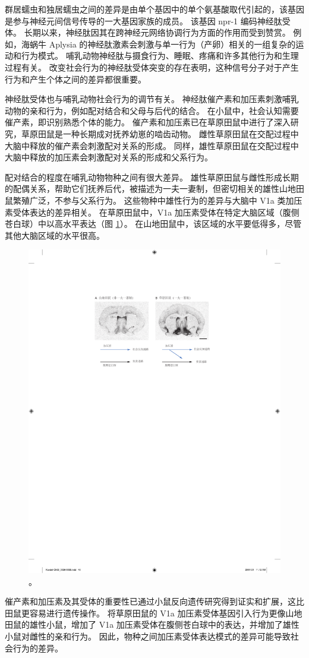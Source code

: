 群居蠕虫和独居蠕虫之间的差异是由单个基因中的单个氨基酸取代引起的，该基因是参与神经元间信号传导的一大基因家族的成员。 
该基因 npr-1 编码神经肽受体。 
长期以来，神经肽因其在跨神经元网络协调行为方面的作用而受到赞赏。 
例如，海蜗牛 Aplysia 的神经肽激素会刺激与单一行为（产卵）相关的一组复杂的运动和行为模式。 
哺乳动物神经肽与摄食行为、睡眠、疼痛和许多其他行为和生理过程有关。 
改变社会行为的神经肽受体突变的存在表明，这种信号分子对于产生行为和产生个体之间的差异都很重要。


神经肽受体也与哺乳动物社会行为的调节有关。 
神经肽催产素和加压素刺激哺乳动物的亲和行为，例如配对结合和父母与后代的结合。 
在小鼠中，社会认知需要催产素，即识别熟悉个体的能力。 
催产素和加压素已在草原田鼠中进行了深入研究，草原田鼠是一种长期成对抚养幼崽的啮齿动物。 
雌性草原田鼠在交配过程中大脑中释放的催产素会刺激配对关系的形成。 
同样，雄性草原田鼠在交配过程中大脑中释放的加压素会刺激配对关系的形成和父系行为。


配对结合的程度在哺乳动物物种之间有很大差异。 
雄性草原田鼠与雌性形成长期的配偶关系，帮助它们抚养后代，被描述为一夫一妻制，但密切相关的雄性山地田鼠繁殖广泛，不参与父系行为。 
这些物种中雄性行为的差异与大脑中 V1a 类加压素受体表达的差异相关。 
在草原田鼠中，V1a 加压素受体在特定大脑区域（腹侧苍白球）中以高水平表达（图 \ref{fig:2_16}）。 
在山地田鼠中，该区域的水平要低得多，尽管其他大脑区域的水平很高。

\begin{figure}[htbp]
	\centering
	\includegraphics[width=0.5\linewidth]{chap02/fig_2_16}
	\caption{。}
	\label{fig:2_16}
\end{figure}


催产素和加压素及其受体的重要性已通过小鼠反向遗传研究得到证实和扩展，这比田鼠更容易进行遗传操作。 
将草原田鼠的 V1a 加压素受体基因引入行为更像山地田鼠的雄性小鼠，增加了 V1a 加压素受体在腹侧苍白球中的表达，并增加了雄性小鼠对雌性的亲和行为。 
因此，物种之间加压素受体表达模式的差异可能导致社会行为的差异。



